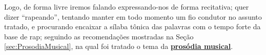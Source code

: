 Logo, de forma livre iremos falando expressando-nos  de forma recitativa;
quer dizer ``rapeando'', tentando manter em todo momento um fio condutor no assunto tratado,
e procurando encaixar a sílaba tônica das palavras
com o tempo forte da base de rap; seguindo as recomendações mostradas na Seção \ref{sec:ProsodiaMusical},
na qual foi tratado o tema da \hyperref[sec:ProsodiaMusical]{\textbf{prosódia musical}}.
